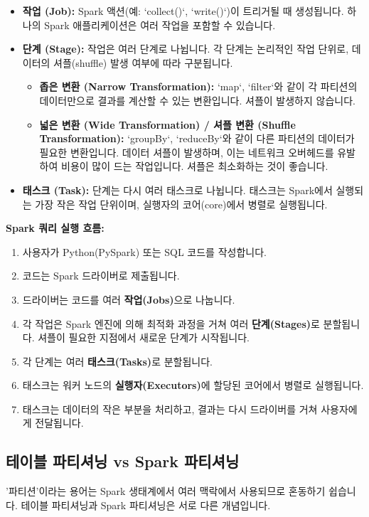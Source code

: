 \documentclass[11pt,a4paper]{article}
\begin{document}
\begin{itemize}
    \item \textbf{작업 (Job):} Spark 액션(예: `collect()`, `write()`)이 트리거될 때 생성됩니다. 하나의 Spark 애플리케이션은 여러 작업을 포함할 수 있습니다.
    \item \textbf{단계 (Stage):} 작업은 여러 단계로 나뉩니다. 각 단계는 논리적인 작업 단위로, 데이터의 셔플(shuffle) 발생 여부에 따라 구분됩니다.
    \begin{itemize}
        \item \textbf{좁은 변환 (Narrow Transformation):} `map`, `filter`와 같이 각 파티션의 데이터만으로 결과를 계산할 수 있는 변환입니다. 셔플이 발생하지 않습니다.
        \item \textbf{넓은 변환 (Wide Transformation) / 셔플 변환 (Shuffle Transformation):} `groupBy`, `reduceBy`와 같이 다른 파티션의 데이터가 필요한 변환입니다. 데이터 셔플이 발생하며, 이는 네트워크 오버헤드를 유발하여 비용이 많이 드는 작업입니다. 셔플은 최소화하는 것이 좋습니다.
    \end{itemize}
    \item \textbf{태스크 (Task):} 단계는 다시 여러 태스크로 나뉩니다. 태스크는 Spark에서 실행되는 가장 작은 작업 단위이며, 실행자의 코어(core)에서 병렬로 실행됩니다.
\end{itemize}

\begin{examplebox}
\textbf{Spark 쿼리 실행 흐름:}
\begin{enumerate}
    \item 사용자가 Python(PySpark) 또는 SQL 코드를 작성합니다.
    \item 코드는 Spark 드라이버로 제출됩니다.
    \item 드라이버는 코드를 여러 \textbf{작업(Jobs)}으로 나눕니다.
    \item 각 작업은 Spark 엔진에 의해 최적화 과정을 거쳐 여러 \textbf{단계(Stages)}로 분할됩니다. 셔플이 필요한 지점에서 새로운 단계가 시작됩니다.
    \item 각 단계는 여러 \textbf{태스크(Tasks)}로 분할됩니다.
    \item 태스크는 워커 노드의 \textbf{실행자(Executors)}에 할당된 코어에서 병렬로 실행됩니다.
    \item 태스크는 데이터의 작은 부분을 처리하고, 결과는 다시 드라이버를 거쳐 사용자에게 전달됩니다.
\end{enumerate}
\end{examplebox}

\subsection{테이블 파티셔닝 vs Spark 파티셔닝}
'파티션'이라는 용어는 Spark 생태계에서 여러 맥락에서 사용되므로 혼동하기 쉽습니다. 테이블 파티셔닝과 Spark 파티셔닝은 서로 다른 개념입니다.
\end{document}
